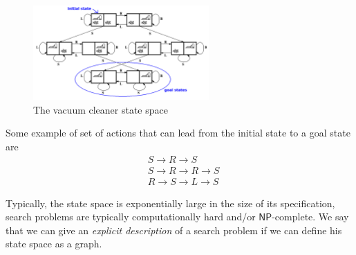 \documentclass[10pt, letterpaper]{report}
\begin{document}
\begin{figure}[h!]
    \centering
    \includegraphics[width=0.6\textwidth ]{images/vacuum.png}
    \caption{The vacuum cleaner state space}
    \label{img:vacuum_cleaner}
\end{figure}
Some example of set of actions that can lead from the initial state to a goal state are\begin{align*}
    &S\longrightarrow R\longrightarrow S\\
    &S\longrightarrow R\longrightarrow R\longrightarrow S\\
    &R\longrightarrow S\longrightarrow L\longrightarrow S
\end{align*}

Typically, the state space is exponentially large in the size of its specification, search problems are typically computationally hard and/or $\mathsf{NP}$-complete. We say that we can give an \textit{explicit description} of a search problem if we can define his state space as a graph.
\end{document}

